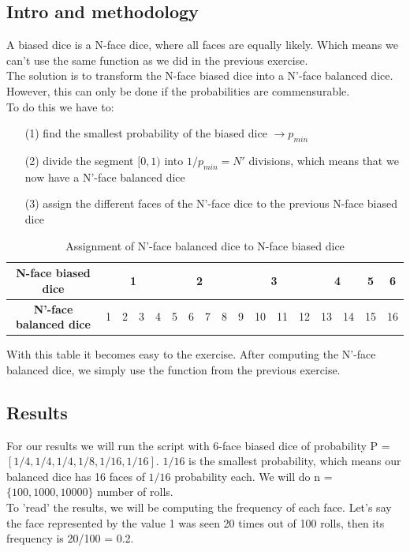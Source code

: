 \documentclass[a4paper]{article}
\begin{document}
\subsection*{Intro and methodology}
A biased dice is a N-face dice, where all faces are equally likely. Which means we can't use the same function as we did in the previous exercise.\\
The solution is to transform the N-face biased dice into a N'-face balanced dice. However, this can only be done if the probabilities are commensurable.\\
To do this we have to:
\begin{itemize}
\item [(1)] find the smallest probability of the biased dice $\longrightarrow p_{min}$
\item [(2)] divide the segment $[0, 1)$ into $1/p_{min} = N'$ divisions, which means that we now have a N'-face balanced dice
\item [(3)] assign the different faces of the N'-face dice to the previous N-face biased dice
\end{itemize}
\begin{table}[H]
\begin{center}
\begin{tabular}{|c|c|c|c|c|c|c|c|c|c|c|c|c|c|c|c|c|}
\hline
\textbf{N-face biased dice}    & \multicolumn{4}{c|}{1} & \multicolumn{4}{c|}{2} & \multicolumn{4}{c|}{3} & \multicolumn{2}{c|}{4} & 5  & 6  \\ \hline
\textbf{N'-face balanced dice} & 1    & 2   & 3   & 4   & 5    & 6   & 7   & 8   & 9   & 10   & 11  & 12  & 13         & 14        & 15 & 16 \\ \hline
\end{tabular}
\caption*{\label{BD} Assignment of N'-face balanced dice to N-face biased dice}
\end{center}
\end{table}
With this table it becomes easy to the exercise. After computing the N'-face balanced dice, we simply use the function from the previous exercise.
\subsection*{Results}
For our results we will run the script with 6-face biased dice of probability P = $[ 1/4, 1/4, 1/4, 1/8, 1/16, 1/16]$. $1/16$ is the smallest probability, which means our balanced dice has 16 faces of $1/16$ probability each. We will do n = $\{ 100, 1000, 10000\}$ number of rolls.\\
To 'read' the results, we will be computing the frequency of each face. Let's say the face represented by the value 1 was seen 20 times out of 100 rolls, then its frequency is 20/100 = 0.2.
\end{document}
